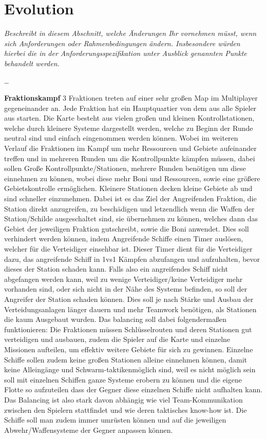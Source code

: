 \documentclass[fontsize=12pt,paper=a4,twoside]{scrartcl}
\begin{document}
\section{Evolution} \label{sec:evolution}

{\itshape Beschreibt in diesem Abschnitt, welche Änderungen Ihr vornehmen müsst,
wenn sich Anforderungen oder Rahmenbedingungen ändern. Insbesondere würden 
hierbei die in der Anforderungsspezifikation unter \glqq{}Ausblick\grqq{} 
genannten Punkte behandelt werden.}

\dots

\textbf{Fraktionskampf}
3 Fraktionen treten auf einer sehr großen Map im Multiplayer gegeneinander an. Jede Fraktion hat ein Hauptquartier von dem aus alle Spieler aus starten. Die Karte besteht aus vielen großen und kleinen Kontrollstationen, welche durch kleinere Systeme dargestellt werden, welche zu Beginn der Runde neutral sind und einfach eingenommen werden können. Wobei im weiteren Verlauf die Fraktionen im Kampf um mehr Ressourcen und Gebiete aufeinander treffen und in mehreren Runden um die Kontrollpunkte kämpfen müssen, dabei sollen Große Kontrollpunkte/Stationen, mehrere Runden benötigen um diese einnehmen zu können, wobei diese mehr Boni und Ressourcen, sowie eine größere Gebietskontrolle ermöglichen. Kleinere Stationen decken kleine Gebiete ab und sind schneller einzunehmen. Dabei ist es das Ziel der Angreifenden Fraktion, die Station direkt anzugreifen, zu beschädigen und letzendlich wenn die Waffen der Station/Schilde ausgeschaltet sind, sie übernehmen zu können, welches dann das Gebiet der jeweiligen Fraktion gutschreibt, sowie die Boni anwendet. Dies soll verhindert werden können, indem Angreifende Schiffe einen Timer auslösen, welcher für die Verteidiger einsehbar ist. Dieser Timer dient für die Verteidiger dazu, das angreifende Schiff in 1vs1 Kämpfen abzufangen und aufzuhalten, bevor dieses der Station schaden kann. Falls also ein angreifendes Schiff nicht abgefangen werden kann, weil zu wenige Verteidiger/keine Verteidiger mehr vorhanden sind, oder sich nicht in der Nähe des Systems befinden, so soll der Angreifer der Station schaden können. Dies soll je nach Stärke und Ausbau der Verteidungsanlagen länger dauern und mehr Teamwork benötigen, als Stationen die kaum Ausgebaut wurden. Das balancing soll dabei folgendermaßen funktionieren: Die Fraktionen müssen Schlüsselrouten und deren Stationen gut verteidigen und ausbauen, zudem die Spieler auf die Karte und einzelne \glqq Missionen\grqq{} aufteilen, um effektiv weitere Gebiete für sich zu gewinnen. Einzelne Schiffe sollen zudem keine großen Stationen alleine einnehmen können, damit keine Alleingänge und \glqq Schwarm-taktiken\grqq{}möglich sind, weil es nicht möglich sein soll mit einzelnen Schiffen ganze Systeme erobern zu können und die eigene Flotte so aufzuteilen dass der Gegner diese einzelnen Schiffe nicht aufhalten kann. Das Balancing ist also stark davon abhängig wie viel Team-Kommunikation zwischen den Spielern stattfindet und wie deren taktisches know-how ist. Die Schiffe soll man zudem immer umrüsten können und auf die jeweiligen Abwehr/Waffensysteme der Gegner anpassen können. 
\end{document}
